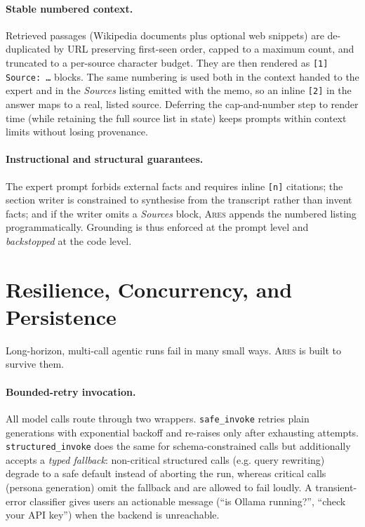 \documentclass[10pt,twocolumn]{article}
\newcommand{\ares}{\textsc{Ares}}
\newcommand{\code}[1]{\texttt{\small #1}}
\begin{document}
\paragraph{Stable numbered context.} Retrieved passages (Wikipedia documents plus
optional web snippets) are de-duplicated by URL preserving first-seen order,
capped to a maximum count, and truncated to a per-source character budget. They
are then rendered as \code{[1] Source: \dots} blocks. The same numbering is used
both in the context handed to the expert and in the \emph{Sources} listing
emitted with the memo, so an inline \code{[2]} in the answer maps to a real,
listed source. Deferring the cap-and-number step to render time (while retaining
the full source list in state) keeps prompts within context limits without losing
provenance.

\paragraph{Instructional and structural guarantees.} The expert prompt forbids
external facts and requires inline \code{[n]} citations; the section writer is
constrained to synthesise from the transcript rather than invent facts; and if
the writer omits a \emph{Sources} block, \ares{} appends the numbered listing
programmatically. Grounding is thus enforced at the prompt level and
\emph{backstopped} at the code level.

\section{Resilience, Concurrency, and Persistence}
\label{sec:resilience}

Long-horizon, multi-call agentic runs fail in many small ways. \ares{} is built
to survive them.

\paragraph{Bounded-retry invocation.} All model calls route through two wrappers.
\code{safe\_invoke} retries plain generations with exponential backoff and
re-raises only after exhausting attempts. \code{structured\_invoke} does the same
for schema-constrained calls but additionally accepts a \emph{typed fallback}:
non-critical structured calls (e.g. query rewriting) degrade to a safe default
instead of aborting the run, whereas critical calls (persona generation) omit the
fallback and are allowed to fail loudly. A transient-error classifier gives users
an actionable message (``is Ollama running?'', ``check your API key'') when the
backend is unreachable.
\end{document}
